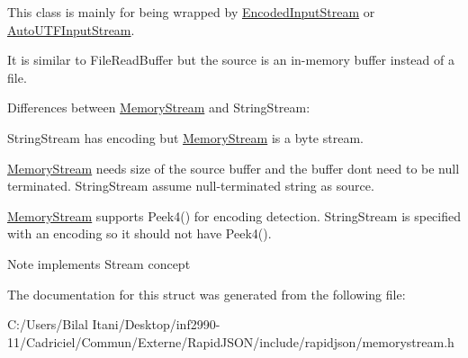 This class is mainly for being wrapped by \hyperlink{class_encoded_input_stream}{Encoded\+Input\+Stream} or \hyperlink{class_auto_u_t_f_input_stream}{Auto\+U\+T\+F\+Input\+Stream}.

It is similar to File\+Read\+Buffer but the source is an in-\/memory buffer instead of a file.

Differences between \hyperlink{struct_memory_stream}{Memory\+Stream} and String\+Stream\+:
\begin{DoxyEnumerate}
\item String\+Stream has encoding but \hyperlink{struct_memory_stream}{Memory\+Stream} is a byte stream.
\item \hyperlink{struct_memory_stream}{Memory\+Stream} needs size of the source buffer and the buffer don\textquotesingle{}t need to be null terminated. String\+Stream assume null-\/terminated string as source.
\item \hyperlink{struct_memory_stream}{Memory\+Stream} supports Peek4() for encoding detection. String\+Stream is specified with an encoding so it should not have Peek4(). \begin{DoxyNote}{Note}
implements Stream concept 
\end{DoxyNote}

\end{DoxyEnumerate}

The documentation for this struct was generated from the following file\+:\begin{DoxyCompactItemize}
\item 
C\+:/\+Users/\+Bilal Itani/\+Desktop/inf2990-\/11/\+Cadriciel/\+Commun/\+Externe/\+Rapid\+J\+S\+O\+N/include/rapidjson/memorystream.\+h\end{DoxyCompactItemize}
